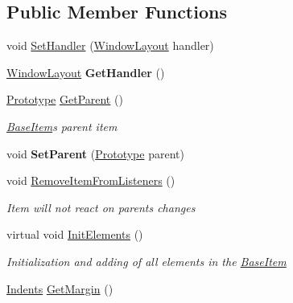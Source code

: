 \subsection*{Public Member Functions}
\begin{DoxyCompactItemize}
\item 
void \mbox{\hyperlink{class_space_v_i_l_1_1_base_item_af62e189b018fffc486961909ab4671cb}{Set\+Handler}} (\mbox{\hyperlink{class_space_v_i_l_1_1_window_layout}{Window\+Layout}} handler)
\item 
\mbox{\label{class_space_v_i_l_1_1_base_item_a75711759b9a916390f30a994e41f653b}} 
\mbox{\hyperlink{class_space_v_i_l_1_1_window_layout}{Window\+Layout}} {\bfseries Get\+Handler} ()
\item 
\mbox{\hyperlink{class_space_v_i_l_1_1_prototype}{Prototype}} \mbox{\hyperlink{class_space_v_i_l_1_1_base_item_af249ff93f366ebc0020d171276576426}{Get\+Parent}} ()
\begin{DoxyCompactList}\small\item\em \mbox{\hyperlink{class_space_v_i_l_1_1_base_item}{Base\+Item}}\textquotesingle{}s parent item \end{DoxyCompactList}\item 
\mbox{\label{class_space_v_i_l_1_1_base_item_a93ab7f178605794c1016e566031a791f}} 
void {\bfseries Set\+Parent} (\mbox{\hyperlink{class_space_v_i_l_1_1_prototype}{Prototype}} parent)
\item 
void \mbox{\hyperlink{class_space_v_i_l_1_1_base_item_a07e16796013b2e7d71b303c006ea2bc7}{Remove\+Item\+From\+Listeners}} ()
\begin{DoxyCompactList}\small\item\em Item will not react on parent\textquotesingle{}s changes \end{DoxyCompactList}\item 
virtual void \mbox{\hyperlink{class_space_v_i_l_1_1_base_item_a8dd530484abb5ad9ba9abd92117e735b}{Init\+Elements}} ()
\begin{DoxyCompactList}\small\item\em Initialization and adding of all elements in the \mbox{\hyperlink{class_space_v_i_l_1_1_base_item}{Base\+Item}} \end{DoxyCompactList}\item 
\mbox{\hyperlink{struct_space_v_i_l_1_1_decorations_1_1_indents}{Indents}} \mbox{\hyperlink{class_space_v_i_l_1_1_base_item_ab470c6d47d0c5c9e218424a9054c4b53}{Get\+Margin}} ()

\end{DoxyCompactItemize}
